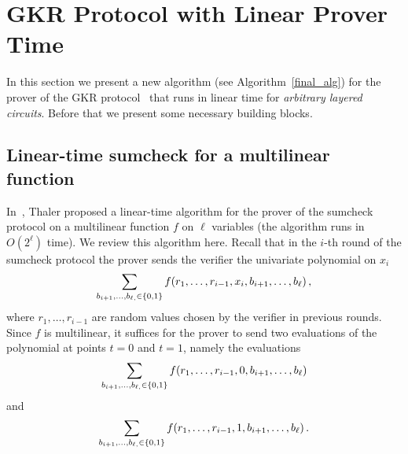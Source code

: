\section{GKR Protocol with Linear Prover Time}
\label{sec::gkrlin}

In this section we present a new algorithm (see Algorithm~\ref{final_alg}) for the prover of the GKR protocol~\cite{GKR} that runs in linear time for \emph{arbitrary layered circuits}. Before that we present some necessary building blocks.

\subsection{Linear-time sumcheck for a multilinear function~\cite{JT_Thesis}}
In~\cite{JT_Thesis}, Thaler proposed a linear-time algorithm for the prover of the sumcheck protocol on a multilinear function $f$ on $\ell$ variables (the algorithm runs in $O(2^\ell)$ time). We review this algorithm here. Recall that in the $i$-th round of the sumcheck protocol the prover sends the verifier the univariate polynomial on $x_i$ $$\sum_{b_{i+1}, \ldots,b_{\ell, }\in\{0,1\}}f(r_1,\ldots, r_{i-1}, x_{i}, b_{i+1},\ldots, b_{\ell})\, ,$$
where $r_1, \ldots, r_{i-1}$ are random values chosen by the verifier in previous rounds. Since $f$ is multilinear, it suffices for the prover to send two evaluations of the polynomial at points $t = 0$ and $t=1$, namely the evaluations
\begin{equation}\label{0-message}
\sum_{b_{i+1}, \ldots,b_{\ell, }\in\{0,1\}}f(r_1,\ldots, r_{i-1}, 0, b_{i+1},\ldots, b_{\ell})
\end{equation} and  
\begin{equation}\label{1-message}
\sum_{b_{i+1}, \ldots,b_{\ell, }\in\{0,1\}}f(r_1,\ldots, r_{i-1}, 1, b_{i+1},\ldots, b_{\ell})\,.
\end{equation}



